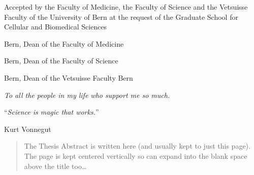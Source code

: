 \documentclass[
11pt, %
english, %
singlespacing, %
headsepline, %
]{MastersDoctoralThesis} %
\begin{document}
\cleardoublepage
{
\setlength\parindent{0pt} %
\vspace*{2cm}

Accepted by the Faculty of Medicine, the Faculty of Science and the Vetsuisse Faculty of the University of Bern at the request of the Graduate School for Cellular and Biomedical Sciences \vspace{2cm}

Bern, \hspace{3cm} Dean of the Faculty of Medicine \vspace{3cm}

Bern, \hspace{3cm}Dean of the Faculty of Science \vspace{3cm}

Bern, \hspace{3cm}Dean of the Vetsuisse Faculty Bern

}



\cleardoublepage
\vspace*{0.2\textheight}

\hfill \textit{To all the people in my life who support me so much.}


\cleardoublepage
\vspace*{0.2\textheight}

\noindent\enquote{\itshape Science is magic that works.}\bigbreak

\hfill Kurt Vonnegut


\begin{abstract}
\addchaptertocentry{\abstractname} %
The Thesis Abstract is written here (and usually kept to just this page). The page is kept centered vertically so can expand into the blank space above the title too\ldots
\end{abstract}
\end{document}
